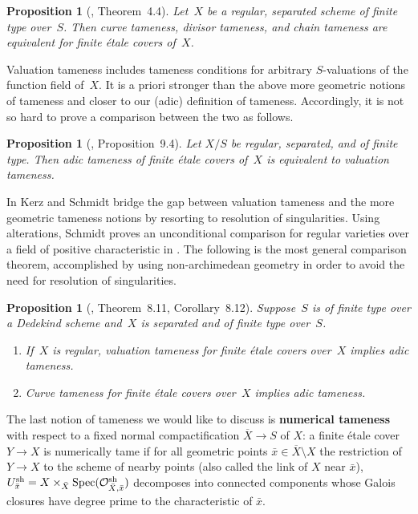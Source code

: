 \documentclass[a4paper,twoside,11pt,reqno]{amsart}
\newcommand{\cO}{{\mathcal O}}
\DeclareMathOperator{\Spec}{Spec}
\newcommand{\sh}{{\rm sh}}   %
\newcommand{\ov}[1]{\overline{#1}}
\newtheorem{prop}[thm]{Proposition}
\theoremstyle{definition}
\numberwithin{equation}{subsection}
\begin{document}
\begin{prop}[\cite{KerzSchmidt2010:DifferentNotionsTameness}, Theorem~4.4]
    Let~$X$ be a regular, separated scheme of finite type over~$S$.
    Then curve tameness, divisor tameness, and chain tameness are equivalent for finite étale covers of~$X$.
\end{prop}

Valuation tameness includes tameness conditions for arbitrary $S$-valuations of the function field of~$X$.
It is a priori stronger than the above more geometric notions of tameness and closer to our (adic) definition of tameness.
Accordingly, it is not so hard to prove a comparison between the two as follows.

\begin{prop}[\cite{Hubner2021:AdicTameSite}, Proposition~9.4]
    Let $X/S$ be regular, separated, and of finite type.
    Then adic tameness of finite étale covers of~$X$ is equivalent to valuation tameness.
\end{prop}

In \cite{KerzSchmidt2010:DifferentNotionsTameness} Kerz and Schmidt bridge the gap between valuation tameness and the more geometric tameness notions by resorting to resolution of singularities.
Using alterations, Schmidt proves an unconditional comparison for regular varieties over a field of positive characteristic  in \cite[Theorem~4.4]{Schmidt-quasi-purity}.
The following is the most general comparison theorem, accomplished by using non-archimedean geometry in order to avoid the need for resolution of singularities.

\begin{prop}[\cite{HuebnerTemkin2026:WildLocus}, Theorem~8.11, Corollary~8.12]
    Suppose~$S$ is of finite type over a Dedekind scheme and~$X$ is separated and of finite type over~$S$.
    \begin{enumerate}
        \item If~$X$ is regular, valuation tameness for finite étale covers over~$X$ implies adic tameness.
        \item Curve tameness for finite étale covers over~$X$ implies adic tameness.
    \end{enumerate}
\end{prop}

The last notion of tameness we would like to discuss is \textbf{numerical tameness} with respect to a fixed normal compactification $\ov X \to S$ of $X$:
a finite étale cover $Y \to X$ is numerically tame if for all geometric points $\bar x \in \ov{X} \setminus X$ the restriction of $Y \to X$ to the scheme of nearby points (also called the link of $X$ near $\bar x$), $ U_{\bar x}^{\sh} = X \times_{\bar X} \Spec(\cO^\sh_{\bar X, \bar x}) $ decomposes into connected components whose Galois closures have degree prime to the characteristic of $\bar x$.
\end{document}
